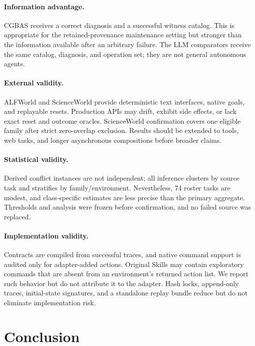 \documentclass[10pt]{article}
\begin{document}
\paragraph{Information advantage.}
CGBAS receives a correct diagnosis and a successful witness catalog. This is
appropriate for the retained-provenance maintenance setting but stronger than the
information available after an arbitrary failure. The LLM comparators receive the
same catalog, diagnosis, and operation set; they are not general autonomous agents.

\paragraph{External validity.}
ALFWorld and ScienceWorld provide deterministic text interfaces, native goals,
and replayable resets. Production APIs may drift, exhibit side effects, or lack
exact reset and outcome oracles. ScienceWorld confirmation covers one eligible
family after strict zero-overlap exclusion. Results should be extended to tools,
web tasks, and longer asynchronous compositions before broader claims.

\paragraph{Statistical validity.}
Derived conflict instances are not independent; all inference clusters by source
task and stratifies by family/environment. Nevertheless, 74 roster tasks are
modest, and class-specific estimates are less precise than the primary aggregate.
Thresholds and analysis were frozen before confirmation, and no failed source was
replaced.

\paragraph{Implementation validity.}
Contracts are compiled from successful traces, and native command support is
audited only for adapter-added actions. Original Skills may contain exploratory
commands that are absent from an environment's returned action list. We report
such behavior but do not attribute it to the adapter. Hash locks, append-only
traces, initial-state signatures, and a standalone replay bundle reduce but do not
eliminate implementation risk.

\section{Conclusion}
\end{document}
